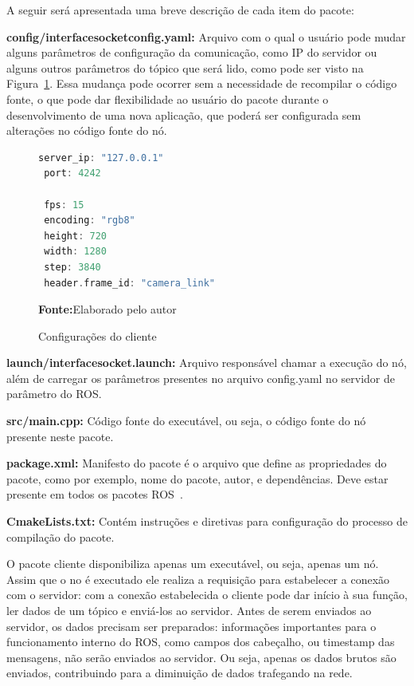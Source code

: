 A seguir será apresentada uma breve descrição de cada item do pacote:
 
\textbf{config/interface\underline{\hspace{.07in}}socket\underline{\hspace{.07in}}config.yaml:} Arquivo com o qual o usuário pode mudar alguns parâmetros de configuração da comunicação, como IP do servidor ou alguns outros parâmetros do tópico que será lido, como pode ser visto na Figura~\ref{fig:codigoconfig}. Essa mudança pode ocorrer sem a necessidade de recompilar o código fonte, o que pode dar flexibilidade ao usuário do pacote durante o desenvolvimento de uma nova aplicação, que poderá ser configurada sem alterações no código fonte do nó. 

\begin{figure}[ht]
\caption{Configurações do cliente}
\begin{center}
\begin{lstlisting}[language=C++, backgroundcolor=\color{gray!10}]
 server_ip: "127.0.0.1"
 port: 4242

 fps: 15
 encoding: "rgb8"
 height: 720
 width: 1280
 step: 3840
 header.frame_id: "camera_link"
\end{lstlisting}
{\small \textbf{Fonte:}Elaborado pelo autor}	
\end{center}\label{fig:codigoconfig}
\end{figure}
	

\textbf{launch/interface\underline{\hspace{.07in}}socket.launch:} Arquivo responsável chamar a execução do nó, além de carregar os parâmetros presentes no arquivo config.yaml no servidor de parâmetro do ROS\@.

\textbf{src/main.cpp:} Código fonte do executável, ou seja, o código fonte do nó presente neste pacote.

\textbf{package.xml:} Manifesto do pacote é o arquivo que define as propriedades do pacote, como por exemplo, nome do pacote, autor, e dependências. Deve estar presente em todos os pacotes ROS~\cite{RosPkgXml}.


\textbf{CmakeLists.txt:} Contém instruções e diretivas para configuração do processo de compilação do pacote.

O pacote cliente disponibiliza apenas um executável, ou seja, apenas um nó. Assim que o no é executado ele realiza a requisição para estabelecer a conexão com o servidor: com a conexão estabelecida o cliente pode dar início à sua função, ler dados de um tópico e enviá-los ao servidor. Antes de serem enviados ao servidor, os dados precisam ser preparados: informações importantes para o funcionamento interno do ROS, como campos dos cabeçalho, ou timestamp das mensagens, não serão enviados ao servidor. Ou seja, apenas os dados brutos são enviados, contribuindo para a diminuição de dados trafegando na rede.

